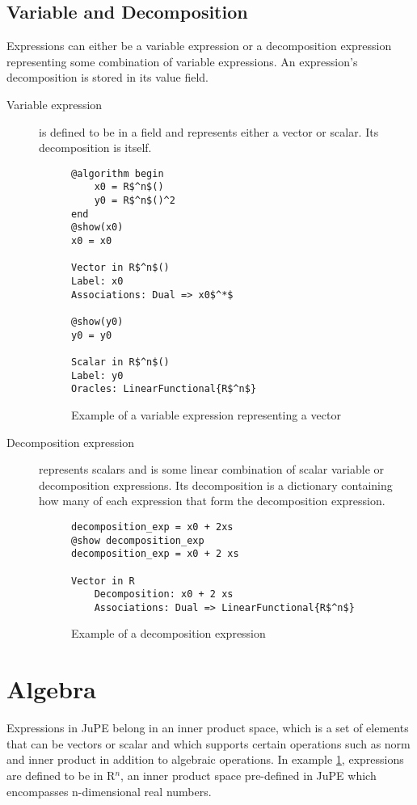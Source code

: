 \subsection*{Variable and Decomposition}
Expressions can either be a variable expression or a decomposition expression representing some combination of variable expressions. An expression's decomposition is stored in its value  field.
\begin{description}
	\item[Variable expression] is defined to be in a field and represents either a vector or scalar. Its decomposition is itself.
\begin{figure}[h]
		\begin{lstlisting}[mathescape]
@algorithm begin
	x0 = R$^n$()
	y0 = R$^n$()^2
end
@show(x0)
x0 = x0

Vector in R$^n$()
Label: x0
Associations: Dual => x0$^*$

@show(y0)
y0 = y0

Scalar in R$^n$()
Label: y0
Oracles: LinearFunctional{R$^n$}
		\end{lstlisting}
	
	\caption{Example of a variable expression representing a vector}
	\label{ex_variable}
\end{figure}
	\item[Decomposition expression] represents scalars and is some linear combination of scalar variable or decomposition expressions. Its decomposition is a dictionary containing how many of each expression that form the decomposition expression.

\begin{figure}[h]
		\begin{lstlisting}[mathescape]
decomposition_exp = x0 + 2xs
@show decomposition_exp 
decomposition_exp = x0 + 2 xs

Vector in R
	Decomposition: x0 + 2 xs
	Associations: Dual => LinearFunctional{R$^n$}
		\end{lstlisting}
	\caption{Example of a decomposition expression }
	\label{ex_decomposition}
\end{figure}
\end{description}

\section{Algebra}
Expressions in JuPE belong in an inner product space, which is a set of elements that can be vectors or scalar and which supports certain operations such as norm and inner product in addition to algebraic operations. In example \ref{ex_variable}, expressions are defined to be in R$^n$, an inner product space pre-defined in JuPE which encompasses n-dimensional real numbers.

